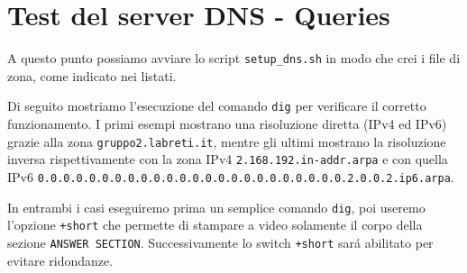 \documentclass[9pt, a4paper, oneside]{article}
\begin{document}
		\section{Test del server DNS - Queries}
			\par
				A questo punto possiamo avviare lo script 
				\texttt{setup\_dns.sh} in modo che crei i file 
				di zona, come indicato nei listati.
			\par
				Di seguito mostriamo l'esecuzione del comando 
				\texttt{dig} per verificare il corretto 
				funzionamento. I primi esempi mostrano una 
				risoluzione diretta (IPv4 ed IPv6) grazie alla 
				zona \texttt{gruppo2.labreti.it}, mentre gli  
				ultimi mostrano la risoluzione inversa 
				rispettivamente con la zona IPv4 
				\texttt{2.168.192.in-addr.arpa} e con quella 
				IPv6 
				\texttt{0.0.0.0.0.0.0.0.0.0.0.0.0.0.0.0.0.0.0.0.0.0.0.0.2.0.0.2.ip6.arpa}.
			\par
				In entrambi i casi eseguiremo prima un 
				semplice comando \texttt{dig}, poi 
				useremo l'opzione \texttt{+short} che permette 
				di stampare a video solamente il corpo della 
				sezione \texttt{ANSWER SECTION}. 
				Successivamente lo switch \texttt{+short} 
				sar\'a abilitato per evitare ridondanze.
\end{document}
